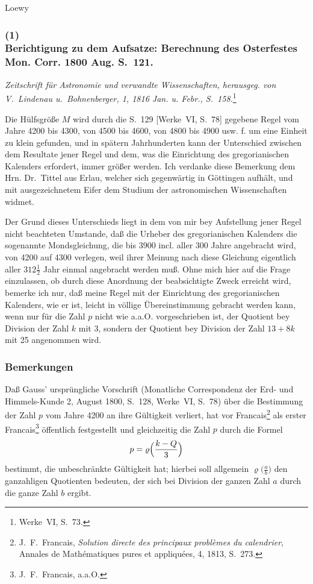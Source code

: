 \documentclass[12pt,a4paper]{article}
\theoremstyle{plain}
\theoremstyle{definition}
\theoremstyle{remark}
\begin{document}
\hfill Loewy

\newpage

\subsubsection*{(1)\\Berichtigung zu dem Aufsatze: Berechnung des Osterfestes Mon. Corr. 1800 Aug. S.~121.}

\textit{Zeitschrift für Astronomie und verwandte Wissenschaften, herausgeg. von V.~Lindenau u.~Bohnenberger, 1, 1816 Jan. u. Febr., S.~158.}\footnote{Werke~VI, S.~73.}

\medskip

Die Hülfsgröße $M$ wird durch die S.~129 [Werke~VI, S.~78] gegebene Regel vom Jahre 4200 bis 4300, von 4500 bis 4600, von 4800 bis 4900 usw. f. um eine Einheit zu klein gefunden, und in spätern Jahrhunderten kann der Unterschied zwischen dem Resultate jener Regel und dem, was die Einrichtung des gregorianischen Kalenders erfordert, immer größer werden. Ich verdanke diese Bemerkung dem Hrn. Dr.~Tittel aus Erlau, welcher sich gegenwärtig in Göttingen aufhält, und mit ausgezeichnetem Eifer dem Studium der astronomischen Wissenschaften widmet.

Der Grund dieses Unterschieds liegt in dem von mir bey Aufstellung jener Regel nicht beachteten Umstande, daß die Urheber des gregorianischen Kalenders die sogenannte Mondsgleichung, die bis 3900 incl. aller 300 Jahre angebracht wird, von 4200 auf 4300 verlegen, weil ihrer Meinung nach diese Gleichung eigentlich aller $312\frac{1}{2}$ Jahr einmal angebracht werden muß. Ohne mich hier auf die Frage einzulassen, ob durch diese Anordnung der beabsichtigte Zweck erreicht wird, bemerke ich nur, daß meine Regel mit der Einrichtung des gregorianischen Kalenders, wie er ist, leicht in völlige Übereinstimmung gebracht werden kann, wenn nur für die Zahl $p$ nicht wie a.a.O. vorgeschrieben ist, der Quotient bey Division der Zahl $k$ mit 3, sondern der Quotient bey Division der Zahl $13 + 8k$ mit 25 angenommen wird.

\newpage

\subsubsection*{Bemerkungen}

Daß Gauss' ursprüngliche Vorschrift (Monatliche Correspondenz der Erd- und Himmels-Kunde 2, August 1800, S.~128, Werke~VI, S.~78) über die Bestimmung der Zahl $p$ vom Jahre 4200 an ihre Gültigkeit verliert, hat vor Francais\footnote{J.~F.~Francais, \textit{Solution directe des principaux problèmes du calendrier}, Annales de Mathématiques pures et appliquées, 4, 1813, S.~273.} als erster Francais\footnote{J.~F.~Francais, a.a.O.} öffentlich festgestellt und gleichzeitig die Zahl $p$ durch die Formel
\[
p = \varrho\Bigl(\frac{k - Q}{3}\Bigr)
\]
bestimmt, die unbeschränkte Gültigkeit hat; hierbei soll allgemein $\varrho\bigl(\frac{a}{b}\bigr)$ den ganzahligen Quotienten bedeuten, der sich bei Division der ganzen Zahl $a$ durch die ganze Zahl $b$ ergibt.
\end{document}
